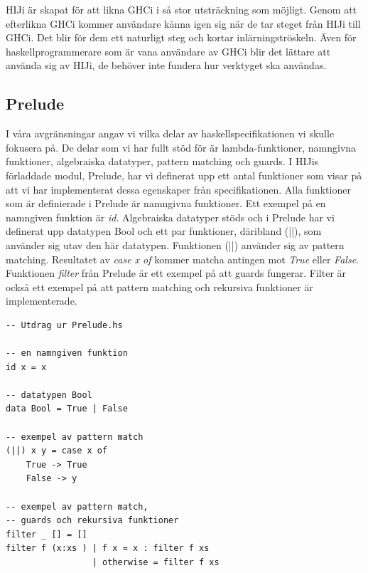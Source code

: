 HIJi är skapat för att likna GHCi i så stor utsträckning som möjligt.
Genom att efterlikna GHCi kommer användare känna igen sig när de tar steget från HIJi till GHCi. Det blir för dem ett naturligt steg och kortar inlärningströskeln. Även för haskellprogrammerare som är vana användare av GHCi blir det lättare att använda sig av HIJi, de behöver inte fundera hur verktyget ska användas.

\subsection{Prelude}
I våra avgränsningar angav vi vilka delar av haskellspecifikationen vi skulle fokusera på. De delar som vi har fullt stöd för är lambda-funktioner, namngivna funktioner, algebraiska datatyper, pattern matching och guards. 
I HIJis förladdade  modul, Prelude, har vi definerat upp ett antal funktioner som visar på att vi har implementerat dessa egenskaper från specifikationen.
Alla funktioner som är definierade i Prelude är namngivna funktioner. Ett exempel på en namngiven funktion är \emph{id}. 
Algebraiska datatyper stöds och i  Prelude har vi definerat upp datatypen Bool och ett par funktioner, däribland (||), som använder sig utav den här datatypen. Funktionen (||) använder sig av pattern matching. Resultatet av \emph{case x of} kommer matcha antingen mot \emph{True} eller \emph{False}.
Funktionen \emph{filter} från Prelude är ett exempel på att guards fungerar. Filter är också ett exempel på att pattern matching och rekursiva funktioner är implementerade. 

\begin{lstlisting}
-- Utdrag ur Prelude.hs

-- en namngiven funktion
id x = x

-- datatypen Bool
data Bool = True | False

-- exempel av pattern match
(||) x y = case x of
    True -> True
    False -> y

-- exempel av pattern match, 
-- guards och rekursiva funktioner
filter _ [] = []
filter f (x:xs ) | f x = x : filter f xs
                 | otherwise = filter f xs
\end{lstlisting}

